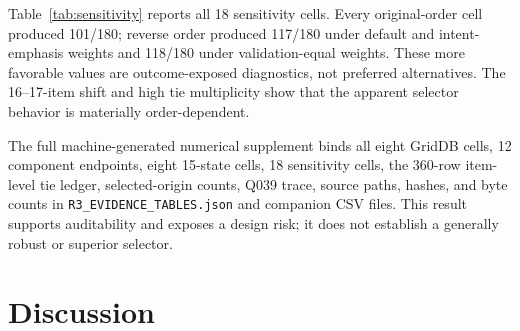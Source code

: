 \documentclass[applsci,article,submit,moreauthors]{Definitions/mdpi}
\begin{document}
Table~\ref{tab:sensitivity} reports all 18 sensitivity cells. Every original-order cell produced 101/180; reverse order produced 117/180 under default and intent-emphasis weights and 118/180 under validation-equal weights. These more favorable values are outcome-exposed diagnostics, not preferred alternatives. The 16--17-item shift and high tie multiplicity show that the apparent selector behavior is materially order-dependent.

\begin{table}[htbp]
\caption{All 18 complete-witness selector sensitivity cells. Each row contains the original- and reverse-order cells for one weight/threshold combination; coverage is 180/180 throughout.}
\label{tab:sensitivity}
\centering
\small
{}
\end{table}

The full machine-generated numerical supplement binds all eight GridDB cells, 12 component endpoints, eight 15-state cells, 18 sensitivity cells, the 360-row item-level tie ledger, selected-origin counts, Q039 trace, source paths, hashes, and byte counts in \texttt{R3\_EVIDENCE\_TABLES.json} and companion CSV files. This result supports auditability and exposes a design risk; it does not establish a generally robust or superior selector.

\section{Discussion}
\end{document}
